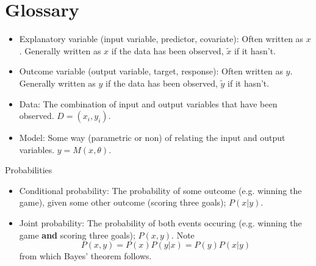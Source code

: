 \documentclass{article}
\begin{document}
\section{Glossary}
\begin{itemize}
    \item Explanatory variable (input variable, predictor, covariate): Often written as $x$. Generally written as $x$ if the data has been observed, $\tilde{x}$ if it hasn't.
    \item Outcome variable (output variable, target, response): Often written as $y$. Generally written as $y$ if the data has been observed, $\tilde{y}$ if it hasn't.
    \item Data: The combination of input and output variables that have been observed. $D = {(x_i, y_i)}$.
    \item Model: Some way (parametric or non) of relating the input and output variables. $y = M(x, \theta)$.
\end{itemize}

Probabilities
\begin{itemize}
    \item Conditional probability: The probability of some outcome (e.g. winning the game), given some other outcome (scoring three goals); $P(x | y)$.
    \item Joint probability: The probability of both events occuring (e.g. winning the game {\bf and} scoring three goals); $P(x, y)$. Note
        \begin{equation}
            P(x, y) = P(x) P(y | x) = P(y) P(x | y)
        \end{equation}
        from which Bayes' theorem follows.

\end{itemize}
\end{document}
